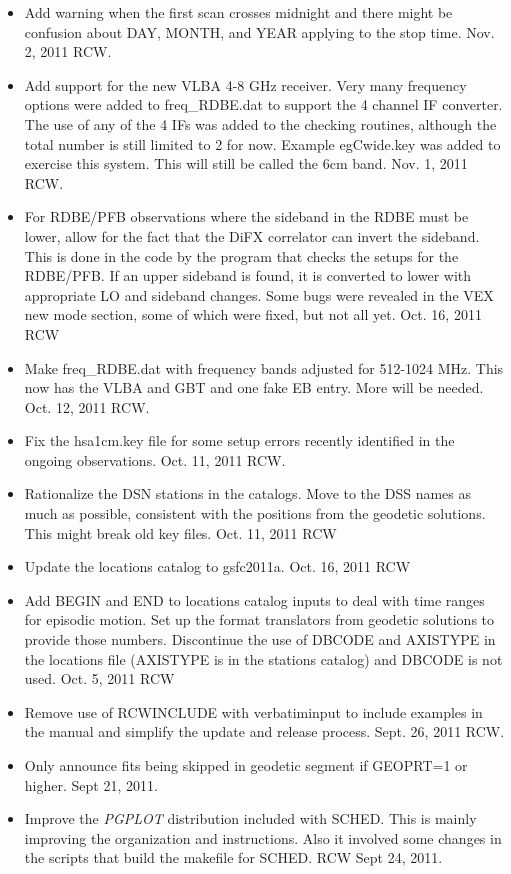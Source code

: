 \documentclass{report}
\newcommand{\sched}{{\sc SCHED}}
\begin{document}
\begin{itemize}
\item Add warning when the first scan crosses midnight and there might
be confusion about DAY, MONTH, and YEAR applying to the stop time.
Nov. 2, 2011  RCW.

\item Add support for the new VLBA 4-8 GHz receiver.  Very many
frequency options were added to freq\_RDBE.dat to support the 4 channel
IF converter.  The use of any of the 4 IFs was added to the checking
routines, although the total number is still limited to 2 for now.
Example egCwide.key was added to exercise this system.  This will still
be called the 6cm band.  Nov. 1, 2011 RCW.

\item For RDBE/PFB observations where the sideband in the RDBE
must be lower, allow for the fact that the DiFX correlator can invert
the sideband.  This is done in the code by the program that checks
the setups for the RDBE/PFB.  If an upper sideband is found, it is
converted to lower with appropriate LO and sideband changes.
Some bugs were revealed in the VEX new mode section,
some of which were fixed, but not all yet.  Oct. 16, 2011  RCW

\item Make freq\_RDBE.dat with frequency bands adjusted for 512-1024 MHz.
This now has the VLBA and GBT and one fake EB entry.  More will be 
needed.  Oct. 12, 2011  RCW.

\item Fix the hsa1cm.key file for some setup errors recently identified
in the ongoing observations.  Oct. 11, 2011  RCW.

\item Rationalize the DSN stations in the catalogs.  Move to the DSS
names as much as possible, consistent with the positions from the 
geodetic solutions.  This might break old key files. Oct. 11, 2011  RCW

\item Update the locations catalog to gsfc2011a.  Oct. 16, 2011  RCW

\item Add BEGIN and END to locations catalog inputs to deal with time
ranges for episodic motion.  Set up the format translators from 
geodetic solutions to provide those numbers.  Discontinue the use
of DBCODE and AXISTYPE in the locations file (AXISTYPE is in the
stations catalog) and DBCODE is not used.  Oct. 5, 2011 RCW

\item Remove use of RCWINCLUDE with verbatiminput to include examples
in the manual and simplify the update and release process.  Sept. 26, 2011
RCW.

\item Only announce fits being skipped in geodetic segment if GEOPRT=1 or
higher.  Sept 21, 2011.

\item Improve the {\sl PGPLOT} distribution included with \sched.  This is
mainly improving the organization and instructions.  Also it involved 
some changes in the scripts that build the makefile for \sched.
RCW  Sept 24, 2011.

\end {itemize}
\end{document}
